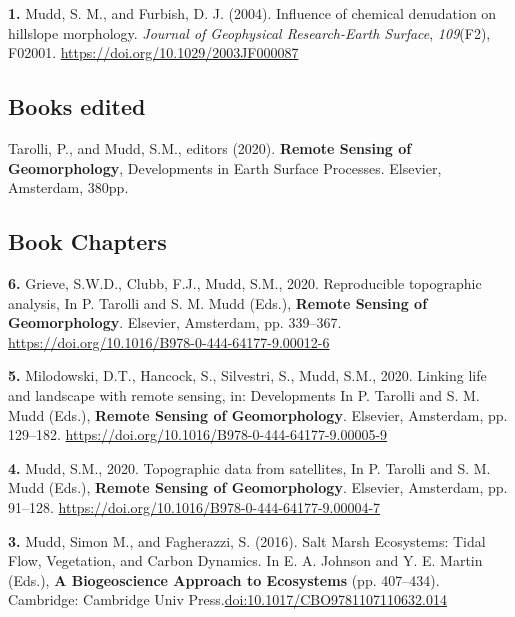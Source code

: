 \documentclass[10pt, a4paper]{article}
\newcommand{\years}[1]{\marginnote{\scriptsize #1}}
\begin{document}
\years{2004}\hangindent=0.7cm\textbf{1. }Mudd, S. M., and Furbish, D. J. (2004). Influence of chemical denudation on hillslope morphology. \textit{Journal of Geophysical Research-Earth Surface}, \textit{109}(F2), F02001. \href{https://doi.org/10.1029/2003JF000087}{https://doi.org/10.1029/2003JF000087}\par


\subsection*{Books edited}
\years{2020}\hangindent=0.7cm Tarolli, P., and Mudd, S.M., editors (2020). \textbf{Remote Sensing of Geomorphology}, Developments in Earth Surface Processes. Elsevier, Amsterdam, 380pp.

\subsection*{Book Chapters}
\noindent

\years{2020}\hangindent=0.7cm\textbf{6. }Grieve, S.W.D., Clubb, F.J., Mudd, S.M., 2020. Reproducible topographic analysis, In P. Tarolli and S. M. Mudd (Eds.), \textbf{Remote Sensing of Geomorphology}. Elsevier, Amsterdam, pp. 339–367. \href{https://doi.org/10.1016/B978-0-444-64177-9.00012-6}{https://doi.org/10.1016/B978-0-444-64177-9.00012-6}\par

\years{2020}\hangindent=0.7cm\textbf{5. }Milodowski, D.T., Hancock, S., Silvestri, S., Mudd, S.M., 2020. Linking life and landscape with remote sensing, in: Developments In P. Tarolli and S. M. Mudd (Eds.), \textbf{Remote Sensing of Geomorphology}. Elsevier, Amsterdam, pp. 129–182. \href{https://doi.org/10.1016/B978-0-444-64177-9.00005-9}{https://doi.org/10.1016/B978-0-444-64177-9.00005-9}\par

\years{2020}\hangindent=0.7cm\textbf{4. }Mudd, S.M., 2020. Topographic data from satellites, In P. Tarolli and S. M. Mudd (Eds.), \textbf{Remote Sensing of Geomorphology}. Elsevier, Amsterdam, pp. 91–128. \href{https://doi.org/10.1016/B978-0-444-64177-9.00004-7}{https://doi.org/10.1016/B978-0-444-64177-9.00004-7}\par

\years{2016}\hangindent=0.7cm\textbf{3. }Mudd, Simon M., and Fagherazzi, S. (2016). Salt Marsh Ecosystems: Tidal Flow, Vegetation, and Carbon Dynamics. In E. A. Johnson and Y. E. Martin (Eds.), \textbf{A Biogeoscience Approach to Ecosystems} (pp. 407--434). Cambridge: Cambridge Univ Press.\href{https://doi.org/10.1017/CBO9781107110632.014}{doi:10.1017/CBO9781107110632.014}\par
\end{document}
